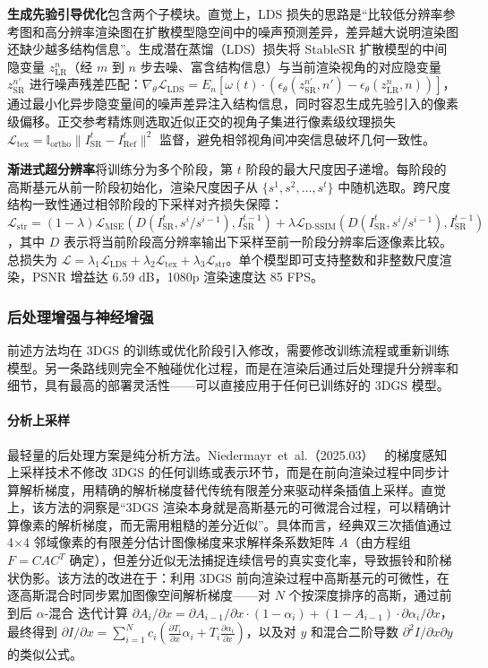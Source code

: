 \textbf{生成先验引导优化}包含两个子模块。直觉上，LDS 损失的思路是“比较低分辨率参考图和高分辨率渲染图在扩散模型隐空间中的噪声预测差异，差异越大说明渲染图还缺少越多结构信息”。生成潜在蒸馏（LDS）损失将 StableSR 扩散模型的中间隐变量 $z_{\text{LR}}^n$（经 $m$ 到 $n$ 步去噪、富含结构信息）与当前渲染视角的对应隐变量 $z_{\text{SR}}^{n'}$ 进行噪声残差匹配：$\nabla_\theta \mathcal{L}_{\text{LDS}} = E_n[\omega(t) \cdot (\epsilon_\theta(z_{\text{SR}}^{n'}, n') - \epsilon_\theta(z_{\text{LR}}^n, n))]$，通过最小化异步隐变量间的噪声差异注入结构信息，同时容忍生成先验引入的像素级偏移。正交参考精炼则选取近似正交的视角子集进行像素级纹理损失 $\mathcal{L}_{\text{tex}} = \mathbb{I}_{\text{ortho}} \| I_{\text{SR}}^t - I_{\text{Ref}}^t \|^2$ 监督，避免相邻视角间冲突信息破坏几何一致性。

\textbf{渐进式超分辨率}将训练分为多个阶段，第 $t$ 阶段的最大尺度因子递增。每阶段的高斯基元从前一阶段初始化，渲染尺度因子从 $\{s^1, s^2, \ldots, s^t\}$ 中随机选取。跨尺度结构一致性通过相邻阶段的下采样对齐损失保障：$\mathcal{L}_{\text{str}} = (1-\lambda) \mathcal{L}_{\text{MSE}}(D(I_{\text{SR}}^t, s^i/s^{i-1}), I_{\text{SR}}^{t-1}) + \lambda \mathcal{L}_{\text{D-SSIM}}(D(I_{\text{SR}}^t, s^i/s^{i-1}), I_{\text{SR}}^{t-1})$，其中 $D$ 表示将当前阶段高分辨率输出下采样至前一阶段分辨率后逐像素比较。总损失为 $\mathcal{L} = \lambda_1 \mathcal{L}_{\text{LDS}} + \lambda_2 \mathcal{L}_{\text{tex}} + \lambda_3 \mathcal{L}_{\text{str}}$。单个模型即可支持整数和非整数尺度渲染，PSNR 增益达 6.59 dB，1080p 渲染速度达 85 FPS。

\subsubsection{后处理增强与神经增强}

前述方法均在 3DGS 的训练或优化阶段引入修改，需要修改训练流程或重新训练模型。另一条路线则完全不触碰优化过程，而是在渲染后通过后处理提升分辨率和细节，具有最高的部署灵活性——可以直接应用于任何已训练好的 3DGS 模型。

\paragraph{分析上采样}

最轻量的后处理方案是纯分析方法。Niedermayr~et~al.（2025.03）~\cite{2503_14171} 的梯度感知上采样技术不修改 3DGS 的任何训练或表示环节，而是在前向渲染过程中同步计算解析梯度，用精确的解析梯度替代传统有限差分来驱动样条插值上采样。直觉上，该方法的洞察是“3DGS 渲染本身就是高斯基元的可微混合过程，可以精确计算像素的解析梯度，而无需用粗糙的差分近似”。具体而言，经典双三次插值通过 4$\times$4 邻域像素的有限差分估计图像梯度来求解样条系数矩阵 $A$（由方程组 $F = CAC^T$ 确定），但差分近似无法捕捉连续信号的真实变化率，导致振铃和阶梯状伪影。该方法的改进在于：利用 3DGS 前向渲染过程中高斯基元的可微性，在逐高斯混合时同步累加图像空间解析梯度——对 $N$ 个按深度排序的高斯，通过前到后 $\alpha$-混合 迭代计算 $\partial A_i / \partial x = \partial A_{i-1} / \partial x \cdot (1{-}\alpha_i) + (1{-}A_{i-1}) \cdot \partial\alpha_i / \partial x$，最终得到 $\partial I / \partial x = \sum_{i=1}^N c_i \left( \frac{\partial T_i}{\partial x} \alpha_i + T_i \frac{\partial \alpha_i}{\partial x} \right)$，以及对 $y$ 和混合二阶导数 $\partial^2 I / \partial x \partial y$ 的类似公式。

